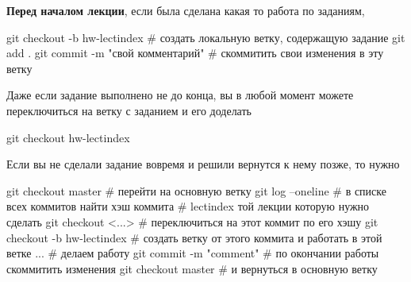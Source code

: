 {\bf Перед началом лекции}, если была сделана какая то работа по заданиям,
\begin{shelloutput}
git checkout -b hw-lect{index}      # создать локальную ветку, содержащую задание
git add .
git commit -m "{свой комментарий}"  # скоммитить свои изменения в эту ветку
\end{shelloutput}

Даже если задание выполнено не до конца, вы в любой момент можете переключиться на ветку с заданием и его доделать
\begin{shelloutput}
git checkout hw-lect{index}
\end{shelloutput}

Если вы не сделали задание вовремя и решили вернутся к нему позже, то нужно
\begin{shelloutput}
git checkout master            # перейти на основную ветку
git log --oneline              # в списке всех коммитов найти хэш коммита
                               # lect{index} той лекции которую нужно сделать
git checkout <...>             # переключиться на этот коммит по его хэшу
git checkout -b hw-lect{index} # создать ветку от этого коммита и работать в этой ветке
...                            # делаем работу
git commit -m "comment"        # по окончании работы скоммитить изменения
git checkout master            # и вернуться в основную ветку
\end{shelloutput}
